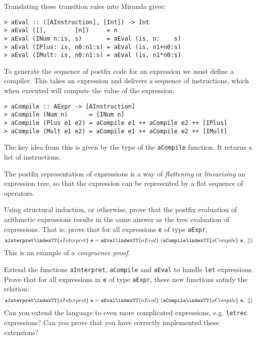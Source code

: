 Translating these transition rules into Miranda gives:
\begin{verbatim}
> aEval :: ([AInstruction], [Int]) -> Int
> aEval ([],        [n])     = n
> aEval (INum n:is, s)       = aEval (is, n:    s)
> aEval (IPlus: is, n0:n1:s) = aEval (is, n1+n0:s)
> aEval (IMult: is, n0:n1:s) = aEval (is, n1*n0:s)
\end{verbatim}
%
%
%
%
%
\par
To generate the sequence of postfix code for an expression we must
define a compiler. This takes an expression and delivers a sequence of
instructions, which when executed will compute the value of the
expression.
\begin{verbatim}
> aCompile :: AExpr -> [AInstruction]
> aCompile (Num n)      = [INum n]
> aCompile (Plus e1 e2) = aCompile e1 ++ aCompile e2 ++ [IPlus]
> aCompile (Mult e1 e2) = aCompile e1 ++ aCompile e2 ++ [IMult]
\end{verbatim}
%
%
%
%
The key idea from this is given by the type of the \mbox{\tt aCompile} function.
It returns a list of instructions.

\begin{important}
The postfix representation of expressions is a way of {\em
flattening} or {\em
linearising} an expression tree, so that
the expression can be represented by a flat sequence of operators.
\end{important}

\begin{exercise}\label{gm:X:structural-induction}
Using structural induction, or otherwise, prove that the postfix evaluation
of arithmetic expressions results in the same answer as the tree evaluation
of expressions. That is: prove that for all expressions \mbox{\tt e} of type \mbox{\tt aExpr},
\[
\mbox{\tt aInterpret}\indexTT{aInterpret}~\mbox{\tt e} = \mbox{\tt aEval}\indexTT{aEval}~(\mbox{\tt aCompile}\indexTT{aCompile}~\mbox{\tt e},~[])
\]
This is an example of a {\em congruence proof}.
\end{exercise}

\begin{exercise}\label{gm:X:structural-induction-hard}
Extend the functions \mbox{\tt aInterpret}, \mbox{\tt aCompile} and \mbox{\tt aEval} to handle
\mbox{\tt let} expressions. Prove that for all expressions in \mbox{\tt e} of type \mbox{\tt aExpr}, these
new functions satisfy the relation:
\[
\mbox{\tt aInterpret}\indexTT{aInterpret}~\mbox{\tt e} = \mbox{\tt aEval}\indexTT{aEval}~(\mbox{\tt aCompile}\indexTT{aCompile}~\mbox{\tt e},~[])
\]
Can you extend the language to even more complicated expressions,
e.g. \mbox{\tt letrec} expressions? Can you prove that you have correctly
implemented these extensions?
\end{exercise}

